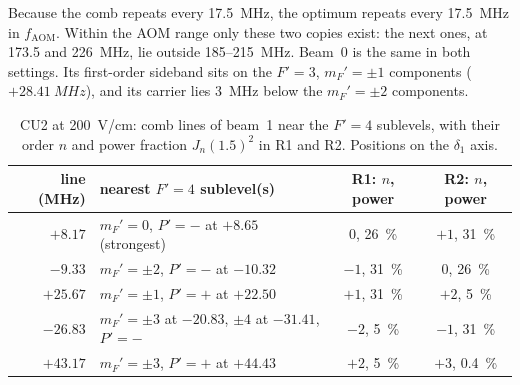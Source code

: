 \documentclass[11pt,a4paper,oneside]{report}
\newcommand{\fAOM}{f_{\mathrm{AOM}}}
\begin{document}
Because the comb repeats every \SI{17.5}{MHz}, the optimum repeats every \SI{17.5}{MHz} in
$\fAOM$. Within the AOM range only these two copies exist: the next ones, at 173.5 and
\SI{226}{MHz}, lie outside 185--\SI{215}{MHz}. Beam~0 is the same in both settings. Its
first-order sideband sits on the $F'=3$, $m_F'=\pm1$ components ($+\SI{28.41}{MHz}$), and its
carrier lies \SI{3}{MHz} below the $m_F'=\pm2$ components.

\begin{table}[htbp]
  \centering
  \caption[CU2: beam-1 comb lines and $F'=4$ sublevels at the two optima]{CU2 at
  \SI{200}{V/cm}: comb lines of beam~1 near the $F'=4$ sublevels, with their order $n$ and power
  fraction $J_n(1.5)^2$ in R1 and R2. Positions on the $\delta_1$ axis.}
  \label{tab:j2_comb}
  \small
  \begin{tabular}{rlcc}
    \toprule
    line (MHz) & nearest $F'=4$ sublevel(s) & R1: $n$, power & R2: $n$, power \\
    \midrule
    $+8.17$ & $m_F'=0$, $P'=-$ at $+8.65$ (strongest) & $0$, \SI{26}{\percent} & $+1$, \SI{31}{\percent} \\
    $-9.33$ & $m_F'=\pm2$, $P'=-$ at $-10.32$ & $-1$, \SI{31}{\percent} & $0$, \SI{26}{\percent} \\
    $+25.67$ & $m_F'=\pm1$, $P'=+$ at $+22.50$ & $+1$, \SI{31}{\percent} & $+2$, \SI{5}{\percent} \\
    $-26.83$ & $m_F'=\pm3$ at $-20.83$, $\pm4$ at $-31.41$, $P'=-$ & $-2$, \SI{5}{\percent} & $-1$, \SI{31}{\percent} \\
    $+43.17$ & $m_F'=\pm3$, $P'=+$ at $+44.43$ & $+2$, \SI{5}{\percent} & $+3$, \SI{0.4}{\percent} \\
    \bottomrule
  \end{tabular}
\end{table}
\end{document}
